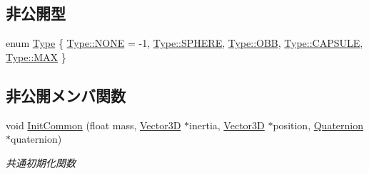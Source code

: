 \subsection*{非公開型}
\begin{DoxyCompactItemize}
\item 
enum \mbox{\hyperlink{class_bullet_physics_object_ac428a5598df5fd4a450197e021420927}{Type}} \{ \newline
\mbox{\hyperlink{class_bullet_physics_object_ac428a5598df5fd4a450197e021420927ab50339a10e1de285ac99d4c3990b8693}{Type\+::\+N\+O\+NE}} = -\/1, 
\mbox{\hyperlink{class_bullet_physics_object_ac428a5598df5fd4a450197e021420927a6f7cea7381e843e2ee0338b4a92b0d43}{Type\+::\+S\+P\+H\+E\+RE}}, 
\mbox{\hyperlink{class_bullet_physics_object_ac428a5598df5fd4a450197e021420927a9aac15e014ce3a36fcbf4a3f669332da}{Type\+::\+O\+BB}}, 
\mbox{\hyperlink{class_bullet_physics_object_ac428a5598df5fd4a450197e021420927a67586f12c9792da11a4bdf60360d40e9}{Type\+::\+C\+A\+P\+S\+U\+LE}}, 
\newline
\mbox{\hyperlink{class_bullet_physics_object_ac428a5598df5fd4a450197e021420927a26a4b44a837bf97b972628509912b4a5}{Type\+::\+M\+AX}}
 \}
\end{DoxyCompactItemize}
\subsection*{非公開メンバ関数}
\begin{DoxyCompactItemize}
\item 
void \mbox{\hyperlink{class_bullet_physics_object_ab4b4e1193398141c29bb8f2fb21e3265}{Init\+Common}} (float mass, \mbox{\hyperlink{class_vector3_d}{Vector3D}} $\ast$inertia, \mbox{\hyperlink{class_vector3_d}{Vector3D}} $\ast$position, \mbox{\hyperlink{_vector3_d_8h_a3ee38c9c46d9851e33a9a1113328dafc}{Quaternion}} $\ast$quaternion)
\begin{DoxyCompactList}\small\item\em 共通初期化関数 \end{DoxyCompactList}\end{DoxyCompactItemize}
